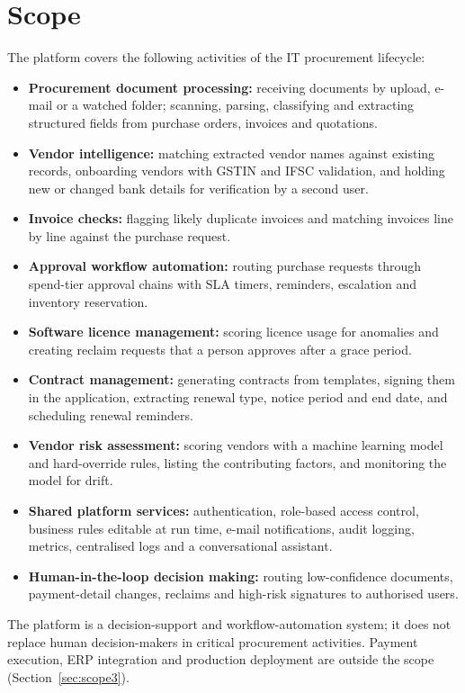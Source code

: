 \section{Scope}
The platform covers the following activities of the IT procurement lifecycle:
\begin{itemize}
  \item \textbf{Procurement document processing:} receiving documents by upload, e-mail or a watched folder; scanning, parsing, classifying and extracting structured fields from purchase orders, invoices and quotations.
  \item \textbf{Vendor intelligence:} matching extracted vendor names against existing records, onboarding vendors with GSTIN and IFSC validation, and holding new or changed bank details for verification by a second user.
  \item \textbf{Invoice checks:} flagging likely duplicate invoices and matching invoices line by line against the purchase request.
  \item \textbf{Approval workflow automation:} routing purchase requests through spend-tier approval chains with SLA timers, reminders, escalation and inventory reservation.
  \item \textbf{Software licence management:} scoring licence usage for anomalies and creating reclaim requests that a person approves after a grace period.
  \item \textbf{Contract management:} generating contracts from templates, signing them in the application, extracting renewal type, notice period and end date, and scheduling renewal reminders.
  \item \textbf{Vendor risk assessment:} scoring vendors with a machine learning model and hard-override rules, listing the contributing factors, and monitoring the model for drift.
  \item \textbf{Shared platform services:} authentication, role-based access control, business rules editable at run time, e-mail notifications, audit logging, metrics, centralised logs and a conversational assistant.
  \item \textbf{Human-in-the-loop decision making:} routing low-confidence documents, payment-detail changes, reclaims and high-risk signatures to authorised users.
\end{itemize}
The platform is a decision-support and workflow-automation system; it does not replace human decision-makers in critical procurement activities. Payment execution, ERP integration and production deployment are outside the scope (Section~\ref{sec:scope3}).

